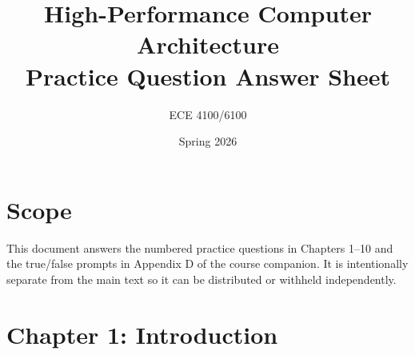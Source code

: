 \documentclass[11pt]{article}
\title{High-Performance Computer Architecture\\Practice Question Answer Sheet}
\author{ECE 4100/6100}
\date{Spring 2026}
\begin{document}
\maketitle
\tableofcontents

\section*{Scope}
This document answers the numbered practice questions in Chapters 1--10 and the true/false prompts in Appendix D of the course companion.
It is intentionally separate from the main text so it can be distributed or withheld independently.

\section{Chapter 1: Introduction}
\end{document}
